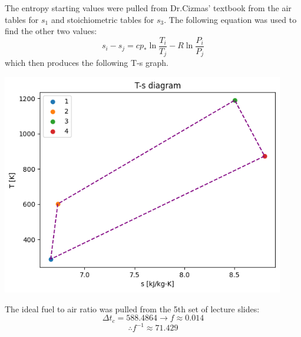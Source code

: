 \documentclass[12pt]{exam}
\begin{document}
\begin{questions}
\begin{solutionorbox}[\stretch{1}]
The entropy starting values were pulled from Dr.Cizmas' textbook from the 
air tables for \(s_1\) and stoichiometric tables for \(s_3\). The following equation
was used to find the other two values:
\[s_i - s_j = cp_*\ln{\frac{T_i}{T_j}} - R\ln{\frac{P_i}{P_j}}\]
which then produces the following T-s graph.
\begin{center}
\includegraphics[width=350pt]{t-s-graph.png}
\end{center}
The ideal fuel to air ratio was pulled from the 5th set of lecture slides:
\[\Delta{t_c} = 588.4864 \rightarrow f \approx 0.014\]
\[\therefore f^{-1} \approx 71.429\]

\end{solutionorbox}

\end{questions}


\end{document}
